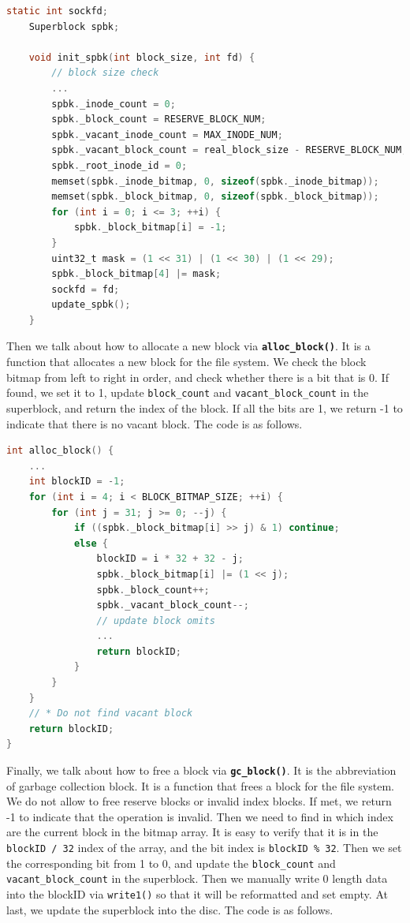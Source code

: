\begin{lstlisting}[language=C]
    static int sockfd;
    Superblock spbk;
    
    void init_spbk(int block_size, int fd) {
        // block size check 
        ... 
        spbk._inode_count = 0;
        spbk._block_count = RESERVE_BLOCK_NUM;
        spbk._vacant_inode_count = MAX_INODE_NUM;
        spbk._vacant_block_count = real_block_size - RESERVE_BLOCK_NUM;
        spbk._root_inode_id = 0;
        memset(spbk._inode_bitmap, 0, sizeof(spbk._inode_bitmap));
        memset(spbk._block_bitmap, 0, sizeof(spbk._block_bitmap));
        for (int i = 0; i <= 3; ++i) {
            spbk._block_bitmap[i] = -1;
        }
        uint32_t mask = (1 << 31) | (1 << 30) | (1 << 29);
        spbk._block_bitmap[4] |= mask;
        sockfd = fd;
        update_spbk();
    }    
\end{lstlisting}

Then we talk about how to allocate a new block via \textbf{\texttt{alloc\_block()}}. It is a function that allocates a new block for the file system.
We check the block bitmap from left to right in order, and check whether there is a bit that is 0. If found, we set it to 1, update \texttt{block\_count} and \texttt{vacant\_block\_count} in the superblock, and return the index of the block.
If all the bits are 1, we return -1 to indicate that there is no vacant block. The code is as follows.

\begin{lstlisting}[language=C]
int alloc_block() {
    ... 
    int blockID = -1;
    for (int i = 4; i < BLOCK_BITMAP_SIZE; ++i) {
        for (int j = 31; j >= 0; --j) {
            if ((spbk._block_bitmap[i] >> j) & 1) continue;
            else {
                blockID = i * 32 + 32 - j;
                spbk._block_bitmap[i] |= (1 << j);
                spbk._block_count++;
                spbk._vacant_block_count--;
                // update block omits
                ... 
                return blockID;
            }
        }
    }
    // * Do not find vacant block
    return blockID;
}
\end{lstlisting}

Finally, we talk about how to free a block via \textbf{\texttt{gc\_block()}}. It is the abbreviation of garbage collection block. It is a function that frees a block for the file system.
We do not allow to free reserve blocks or invalid index blocks. If met, we return -1 to indicate that the operation is invalid.
Then we need to find in which index are the current block in the bitmap array. It is easy to verify that it is in the \texttt{blockID / 32} index of the array, and the bit index is \texttt{blockID \% 32}.
Then we set the corresponding bit from 1 to 0, and update the \texttt{block\_count} and \texttt{vacant\_block\_count} in the superblock. 
Then we manually write 0 length data into the blockID via \texttt{write1()} so that it will be reformatted and set empty. At last, we update the superblock into the disc. The code is as follows.

